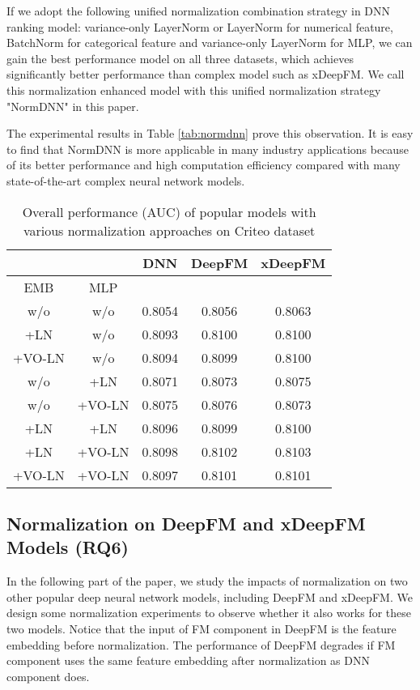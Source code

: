 \documentclass[sigconf]{acmart}
\begin{document}
If we adopt the following unified normalization combination strategy in DNN ranking model:  variance-only LayerNorm or LayerNorm for numerical feature, BatchNorm for categorical feature and variance-only LayerNorm for MLP, we can gain the best performance model on all three datasets, which achieves significantly better performance than complex model such as xDeepFM.  We call this normalization enhanced model with this unified normalization strategy "NormDNN" in this paper.


The experimental results in Table \ref{tab:normdnn} prove this observation. It is easy to find that NormDNN is more applicable in many  industry applications because of its better performance and high computation efficiency compared with many state-of-the-art complex neural network models.



\begin{table}
  \caption{Overall performance (AUC) of popular models with various normalization approaches on Criteo dataset}
  \begin{tabular}{cc|ccc}
    \toprule
 &
     &
DNN &
DeepFM &
xDeepFM \\
\toprule
     EMB &
   MLP &&&\\
   \midrule
w/o & w/o & 0.8054 &
0.8056 &
0.8063 \\
     +LN &
 w/o &
0.8093 &
0.8100 &
0.8100 \\
  +VO-LN &
  w/o &
0.8094 &
0.8099 &
0.8100 \\
    w/o &
   +LN &
0.8071 &
0.8073 &
0.8075 \\
   w/o &
   +VO-LN &
0.8075 &
0.8076 &
0.8073 \\
+LN &
   +LN &
0.8096 &
0.8099 &
0.8100 \\
+LN &
  +VO-LN &
0.8098 &
0.8102 &
0.8103 \\
+VO-LN &
   +VO-LN &
0.8097 &
0.8101 &
0.8101 \\
    \bottomrule
  \end{tabular}
  \label{tab:varnorm_varmodel_auc}
\end{table}

\subsection{Normalization on DeepFM and xDeepFM Models (RQ6)}
In the following part of the paper, we study the impacts of normalization on two other popular deep neural network models, including DeepFM and xDeepFM. We design some normalization experiments to observe whether it also works for these two models. Notice that the input of FM component in DeepFM is the feature embedding before normalization. The performance of DeepFM degrades if FM component uses the same feature embedding after normalization as DNN component does.
\end{document}
